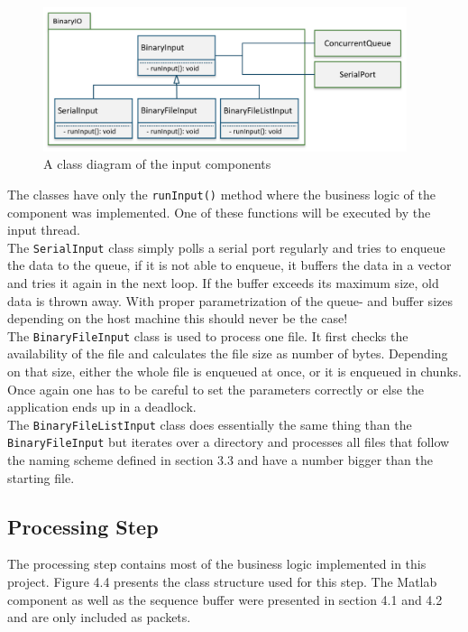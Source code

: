 \begin{figure}[h]
\centering
      \includegraphics[width=0.95\textwidth]{input}
        \caption{A class diagram of the input components}
\end{figure}

The classes have only the \texttt{runInput()} method where the business logic of the component was implemented. One of these functions will be executed by the input thread. \\ The \texttt{SerialInput} class simply polls a serial port regularly and tries to enqueue the data to the queue, if it is not able to enqueue, it buffers the data in a vector and tries it again in the next loop. If the buffer exceeds its maximum size, old data is thrown away. With proper parametrization of the queue- and buffer sizes depending on the host machine this should never be the case!\\
The \texttt{BinaryFileInput} class is used to process one file. It first checks the availability of the file and calculates the file size as number of bytes. Depending on that size, either the whole file is enqueued at once, or it is enqueued in chunks. Once again one has to be careful to set the parameters correctly or else the application ends up  in a deadlock.\\
The \texttt{BinaryFileListInput} class does essentially the same thing than the \texttt{BinaryFileInput} but iterates over a directory and processes all files that follow the naming scheme defined in section 3.3 and have a number bigger than the starting file.
\subsection{Processing Step}
The processing step contains most of the business logic implemented in this project. Figure 4.4 presents the class structure used for this step. The Matlab component as well as the sequence buffer were presented in section 4.1 and 4.2 and are only included as packets.

